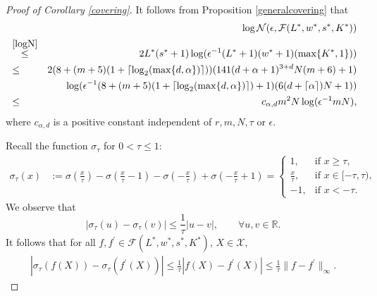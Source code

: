 \documentclass{article}
\def\RR{\mathbb R}
\begin{document}
\begin{proof}[Proof of Corollary \ref{covering}]
It follows from Proposition \ref{generalcovering} that 
    \begin{eqnarray*}
    &&  \log \mathcal{N}(\epsilon,\mathcal{F}(L^*, w^*, s^*, K^*)) \\
    &\stackrel{\eqref{logN}}{\leq}& 2L^* (s^*+1)\log (\epsilon^{-1}(L^*+1)(w^*+1)(\max\{K^*,1\}))\\
         &\leq& 2 (8+ (m+5)(1+\lceil \log_2(\max\{d,\alpha\}) \rceil)) (141 (d+\alpha +1)^{3+d}N (m+6)+1)\\
         && \log (\epsilon^{-1} (8+ (m+5)(1+\lceil \log_2(\max\{d,\alpha\}) \rceil)+1)(6(d+ \lceil \alpha \rceil )N+1))   \\
         &\leq& c_{\alpha, d} m^2  N \log (\epsilon^{-1}mN), 
    \end{eqnarray*}
where $c_{\alpha, d}$ is a positive constant independent of $r, m,N , \tau$ or $\epsilon$. 

Recall the function $\sigma_\tau$  
for $0 < \tau \leq 1$:
\begin{align*}
    \sigma_\tau (x) &:= \sigma\left(\frac{x}{\tau}\right) - \sigma\left(\frac{x}{\tau} -1\right) - \sigma\left(-\frac{x}{\tau}\right)+\sigma\left(-\frac{x}{\tau}+1\right) 
    =
    \begin{cases} 
      1, & \text{if } x \geq \tau, \\
      \frac{x}{\tau}, & \text{if }  x\in [-\tau,\tau),\\
      -1, & \text{if } x < -\tau.
    \end{cases} 
\end{align*}
We observe that 
\begin{equation} 
    |\sigma_\tau(u) - \sigma_\tau(v)| \leq \frac{1}{\tau} |u-v|, \qquad \forall u,v \in \RR.
\end{equation}
It follows that for all $f,f^\prime \in \mathcal{F}(L^*, w^*, s^*, K^*)$,  $X\in \mathcal{X}$,
\begin{eqnarray*}
\left|\sigma_\tau(f(X)) - \sigma_\tau(f^\prime(X))\right| \leq \frac{1}{\tau} |f(X)-f^\prime(X)| \leq \frac{1}{\tau} \|f-f^\prime\|_\infty.
\end{eqnarray*}


\end{proof}
\end{document}
